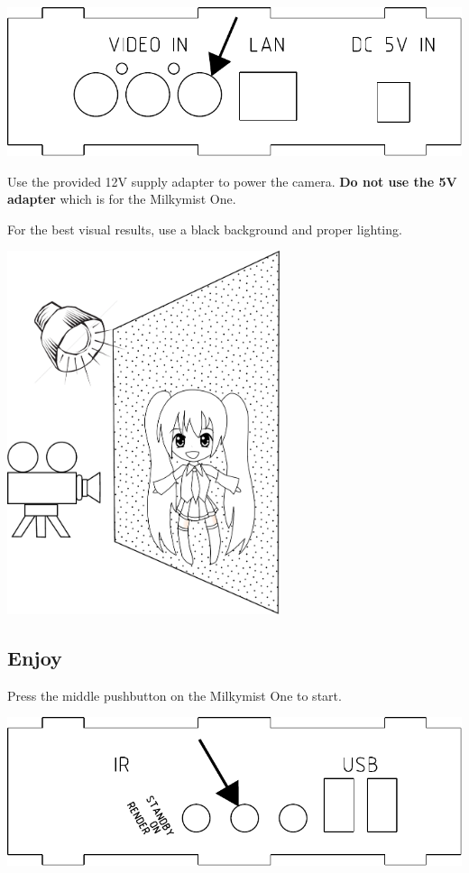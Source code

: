 \documentclass{leaflet}
\begin{document}
\includegraphics[width=\textwidth]{videoin.pdf}

Use the provided 12V supply adapter to power the camera. \textbf{Do not use the 5V adapter} which is for the Milkymist One.

For the best visual results, use a black background and proper lighting.

\includegraphics[width=80mm]{camsetup.pdf}

\subsection{Enjoy}
Press the middle pushbutton on the Milkymist One to start.

\includegraphics[width=\textwidth]{midpb.pdf}
\end{document}
